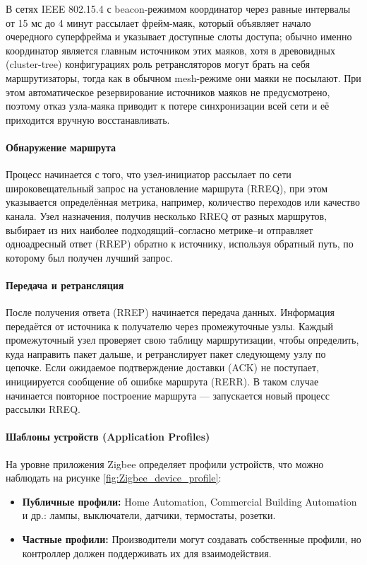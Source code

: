 \documentclass[14pt, a4paper]{extreport}
\begin{document}
В сетях IEEE 802.15.4 с beacon-режимом координатор через равные интервалы от 15 мс до 4 минут рассылает фрейм-маяк, который объявляет начало очередного суперфрейма и указывает
доступные слоты доступа\cite{IEEE802_15_4_2020}; обычно именно координатор является главным источником этих маяков, хотя в древовидных (cluster-tree) конфигурациях роль ретрансляторов
могут брать на себя маршрутизаторы, тогда как в обычном mesh-режиме они маяки не посылают. При этом автоматическое резервирование источников маяков не предусмотрено, поэтому отказ
узла-маяка приводит к потере синхронизации всей сети и её приходится вручную восстанавливать.


\paragraph{Обнаружение маршрута} Процесс начинается с того, что узел-инициатор рассылает по сети широковещательный запрос на установление маршрута (RREQ), при этом указывается
определённая метрика, например, количество переходов или качество канала. Узел назначения, получив несколько RREQ от разных маршрутов, выбирает из них наиболее подходящий--согласно
метрике--и отправляет одноадресный ответ (RREP) обратно к источнику, используя обратный путь, по которому был получен лучший запрос.

\paragraph{Передача и ретрансляция} После получения ответа (RREP) начинается передача данных. Информация передаётся от источника к получателю через промежуточные узлы. Каждый
промежуточный узел проверяет свою таблицу маршрутизации, чтобы определить, куда направить пакет дальше, и ретранслирует пакет следующему узлу по цепочке. Если ожидаемое подтверждение
доставки (ACK) не поступает, инициируется сообщение об ошибке маршрута (RERR). В таком случае начинается повторное построение маршрута — запускается новый процесс рассылки RREQ.


\paragraph{Шаблоны устройств (Application Profiles)}

На уровне приложения Zigbee определяет профили устройств, что можно наблюдать на рисунке \ref{fig:Zigbee_device_profile}:

\begin{itemize}
 \item \textbf{Публичные профили:} Home Automation, Commercial Building Automation и др.: лампы, выключатели, датчики, термостаты, розетки.
 \item \textbf{Частные профили:} Производители могут создавать собственные профили, но контроллер должен поддерживать их для взаимодействия.
\end{itemize}
\end{document}
